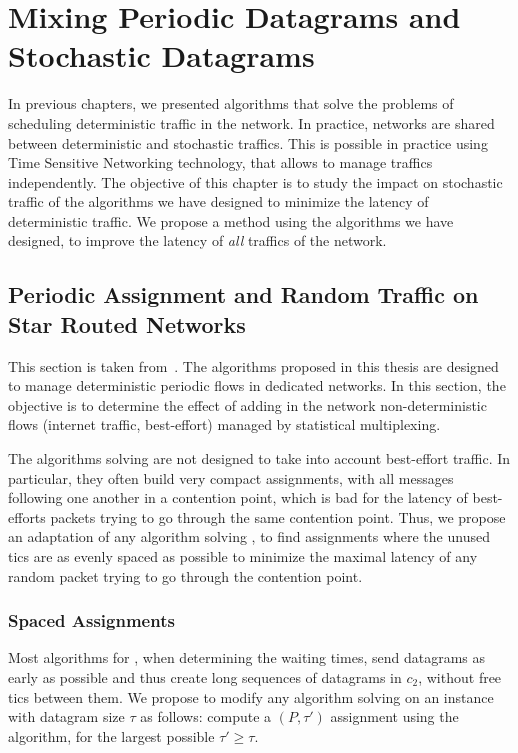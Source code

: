 
\chapter{Mixing Periodic Datagrams and Stochastic Datagrams}
\label{chap:BE}
\minitoc


In previous chapters, we presented algorithms that solve the problems of scheduling deterministic traffic in the network. In practice, networks are shared between deterministic and stochastic traffics. This is possible in practice using Time Sensitive Networking technology, that allows to manage traffics independently. The objective of this chapter is to study the impact on stochastic traffic of the algorithms we have designed to minimize the latency of deterministic traffic. We propose a method using the algorithms we have designed, to improve the latency of \emph{all} traffics of the network.

\section{Periodic Assignment and Random Traffic on Star Routed Networks}\label{sec:comparison}

	This section is taken from~\cite{DBLP:journals/corr/abs-1801-07029}.
    The algorithms proposed in this thesis are designed to manage deterministic periodic flows in dedicated networks. In this section, the objective is to determine the effect of adding in the network non-deterministic flows (internet traffic, best-effort) managed by statistical multiplexing.

    The algorithms solving \pall are not designed to take into account best-effort traffic. In particular, they often build very compact assignments, with all messages following one another in a contention point, which is bad for the latency of best-efforts packets trying to go through the same contention point. Thus, we propose an adaptation of any algorithm solving \pall, to find assignments where the unused tics are as evenly spaced as possible to minimize the maximal latency of any random packet trying to go through the contention point. 
    
    
    \subsection{Spaced Assignments}

    Most algorithms for \pall, when determining the waiting times, send datagrams as early as possible
    and thus create long sequences of datagrams in $c_2$, without free tics between them. We propose to modify any algorithm solving \pall on an instance with datagram size $\tau$ as follows: compute a $(P,\tau')$ assignment using the algorithm, for the largest possible $\tau' \geq \tau$. 


